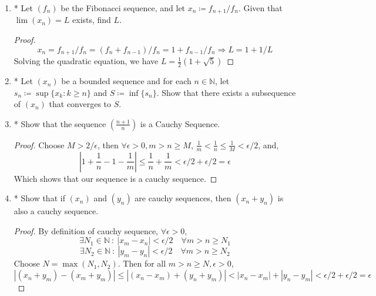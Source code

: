 \begin{enumerate}
\begin{proof}
    The sequence $(c^{1/n})$ is monotone:
    \[ c^{1/n} < c^{1/(n+1)} \Leftrightarrow \frac{1}{n} \ln c < \frac{1}{n+1} \ln c \Rightarrow \frac{1}{n} > \frac{1}{n+1} \forall n \in \mathbb{N}\]
    Which is true, since $n+1 > n \Rightarrow \frac{1}{n+1} < \frac{1}{n}$ for all natural numbers.

    The sequence is bounded:
    \[ c^{1/n} < 1 \Rightarrow c < 1\]
    Which is true since $0 < c < 1$. Then, by monotone convergence theorem, our sequence converges. Let limit be $L$. But, the subsequence $x_{2n} = c^{1/2n} = \sqrt{c^{1/n}}$ also converges to the same limit, which means
    \[ L = \sqrt{L} \Rightarrow L \in \{ 0, 1\}\]
    $L = 0$ is impossible, since $a^x = 0$ iff $a = 0$, but $0 < c$. Then, $L = 1$.
    \end{proof}
\item*  Let $(f_n)$ be the Fibonacci sequence, and let $x_n \coloneq f_{n+1}/f_n$. Given that $\lim(x_n) = L$ exists, find $L$.
    \begin{proof}
        \[ x_n = f_{n+1}/f_n = (f_n+ f_{n-1})/f_n = 1 + f_{n-1}/f_n \Rightarrow L = 1 + 1/L\]
        Solving the quadratic equation, we have $L = \frac{1}{2}(1 + \sqrt{5})$
    \end{proof}
\item * Let $(x_n)$ be a bounded sequence and for each $n \in \mathbb{N}$, let $s_n \coloneq \sup \{x_k : k \ge n \}$ and $S \coloneq \inf \{s_n \}$.
Show that there exists a subsequence of $(x_n)$ that converges to $S$.

\item * Show that the sequence $\left( \frac{n+1}{n}\right)$ is a Cauchy Sequence.
    \begin{proof}
        Choose $ M > 2/ \epsilon $, then $\forall \epsilon > 0, m > n \ge M$, $\frac{1}{m} < \frac{1}{n} \le \frac{1}{M} < \epsilon/2$, and,
        \[ \left| 1 + \frac{1}{n} - 1 - \frac{1}{m} \right| \le  \frac{1}{n} + \frac{1}{m} < \epsilon/2 + \epsilon/2 = \epsilon\]
        Which shows that our sequence is a cauchy sequence.
    \end{proof}
\item* Show that if $(x_n)$ and $(y_n)$ are cauchy sequences, then $(x_n+y_n)$ is also a cauchy sequence.
    \begin{proof}
        By definition of cauchy sequence, $\forall \epsilon > 0$,
        \[ \exists N_1 \in \mathbb{N} \ : \ |x_m - x_n| < \epsilon/2 \quad \forall m > n \ge N_1\]
        \[ \exists N_2 \in \mathbb{N} \ : \ |y_m - y_n| < \epsilon/2 \quad \forall m > n \ge N_2\]
        Choose $N = \max(N_1,N_2)$. Then for all $m > n \ge N, \epsilon > 0$,
        \[ |(x_n+y_m)-(x_m+y_m)| \le |(x_n-x_m) + (y_n+y_m)| < |x_n-x_m| + |y_n-y_m| < \epsilon /2 + \epsilon /2 = \epsilon\]
    \end{proof}
\end{enumerate}
